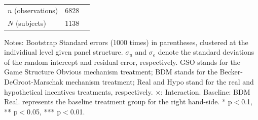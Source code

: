 \documentclass[12pt]{article}
\begin{document}
\begin{table}[H]
{\begin{tabular}{l*{1}{cc}}
\hline
\(n\) (observations)      &        6828         &            \\
\(N\) (subjects)       &        1138         &            \\
\hline \hline
\end{tabular}
}

\begin{tablenotes}
            \footnotesize
             \item Notes: Bootstrap Standard errors (1000 times) in parentheses, clustered at the individiual level given panel structure. $\sigma_u$ and $\sigma_e$ denote the standard deviations of the random intercept and residual error, respectively. GSO stands for the Game Structure Obvious mechanism treatment; BDM stands for the Becker-DeGroot-Marschak mechanism treatment; Real and Hypo stand for the real and hypothetical incentives treatments, respectively. $\times$: Interaction. Baseline: BDM Real. represents the baseline treatment group for the right hand-side.  * p$<$0.1, ** p$<$0.05, *** p$<$0.01.
        \end{tablenotes}
\end{table}



\clearpage
\end{document}
